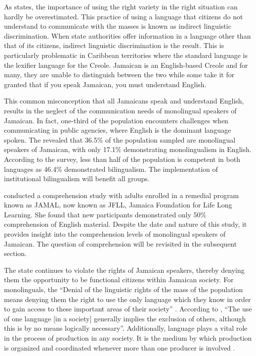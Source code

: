 \documentclass[output=paper,colorlinks,citecolor=brown]{langscibook}
\begin{document}
As \citet[329]{Ferguson1959} states, the importance of using the right variety in the right situation can hardly be overestimated. This practice of using a language that citizens do not understand to communicate with the masses is known as indirect linguistic discrimination. When state authorities offer information in a language other than that of its citizens, indirect linguistic discrimination is the result. This is particularly problematic in Caribbean territories where the standard language is the lexifier language for the Creole. Jamaican is an English-based Creole and for many, they are unable to distinguish between the two while some take it for granted that if you speak Jamaican, you must understand English. 

This common misconception that all Jamaicans speak and understand English, results in the neglect of the communication needs of monolingual speakers of Jamaican. In fact, one-third of the population encounters challenges when communicating in public agencies, where English is the dominant language spoken. The \citet{JamaicanLanguageUnit2006-NationalLangCompetence} revealed that 36.5\% of the population sampled are monolingual speakers of Jamaican, with only 17.1\% demonstrating monolingualism in English. According to the survey, less than half of the population is competent in both languages as 46.4\% demonstrated bilingualism. The implementation of institutional bilingualism will benefit all groups.

\citet{Smalling1983} conducted a comprehension study with adults enrolled in a remedial program known as JAMAL, now known as JFLL, Jamaica Foundation for Life Long Learning. She found that new participants demonstrated only 50\% comprehension of English material. Despite the date and nature of this study, it provides insight into the comprehension levels of monolingual speakers of Jamaican. The question of comprehension will be revisited in the subsequent section.

The state continues to violate the rights of Jamaican speakers, thereby denying them the opportunity to be functional citizens within Jamaican society. For monolinguals, the “Denial of the linguistic rights of the mass of the population means denying them the right to use the only language which they know in order to gain access to these important areas of their society” \citep[18]{Devonish1986}. According to \citet[18]{Phillipson1992}, “The use of one language [in a society] generally implies the exclusion of others, although this is by no means logically necessary”. Additionally, language plays a vital role in the process of production in any society. It is the medium by which production is organized and coordinated whenever more than one producer is involved \citep[16]{Devonish1986}.
\end{document}
